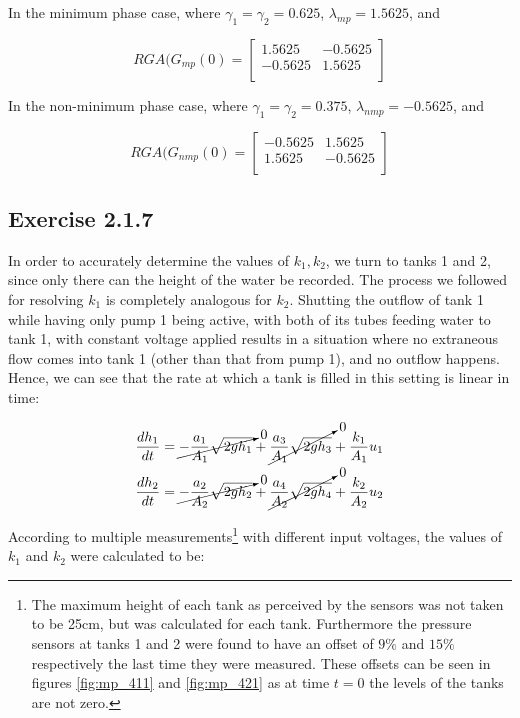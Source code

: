 In the minimum phase case, where $\gamma_1 = \gamma_2 = 0.625$, $\lambda_{mp} = 1.5625$,
and

\[
RGA(G_{mp}(0) =
\begin{bmatrix}
  1.5625 & -0.5625 \\
  -0.5625 & 1.5625 \\
\end{bmatrix}
\]

In the non-minimum phase case, where $\gamma_1 = \gamma_2 = 0.375$, $\lambda_{nmp} = −0.5625$,
and

\[
RGA(G_{nmp}(0) =
\begin{bmatrix}
  -0.5625 & 1.5625 \\
  1.5625 & -0.5625 \\
\end{bmatrix}
\]



\subsection*{Exercise 2.1.7}

In order to accurately determine the values of $k_1, k_2$, we turn to tanks
1 and 2, since only there can the height of the water be recorded. The process
we followed for resolving $k_1$ is completely analogous for $k_2$. Shutting the
outflow of tank 1 while having only pump 1 being active, with both of its tubes
feeding water to tank 1, with constant voltage applied results in a situation
where no extraneous flow comes into tank 1 (other than that from pump 1), and no
outflow happens. Hence, we can see that the rate at which a tank is filled in
this setting is linear in time:

\begin{align*}
  \dfrac{dh_1}{dt} &= \cancelto{0}{-\dfrac{a_1}{A_1}\sqrt{2gh_1}} + \cancelto{0}{\dfrac{a_3}{A_1}\sqrt{2gh_3}} + \dfrac{k_1}{A_1}u_1 \\
  \dfrac{dh_2}{dt} &= \cancelto{0}{-\dfrac{a_2}{A_2}\sqrt{2gh_2}} + \cancelto{0}{\dfrac{a_4}{A_2}\sqrt{2gh_4}} + \dfrac{k_2}{A_2}u_2 \\
\end{align*}

According to multiple measurements\footnote{The maximum height of each tank as
perceived by the sensors was not taken to be 25cm, but was calculated for each
tank. Furthermore the pressure sensors at tanks 1 and 2 were found to have an
offset of $9\%$ and $15\%$ respectively the last time they were measured. These
offsets can be seen in figures \ref{fig:mp_411} and \ref{fig:mp_421} as at time
$t = 0$ the levels of the tanks are not zero.} with
different input voltages, the values of $k_1$ and $k_2$ were calculated to be:

